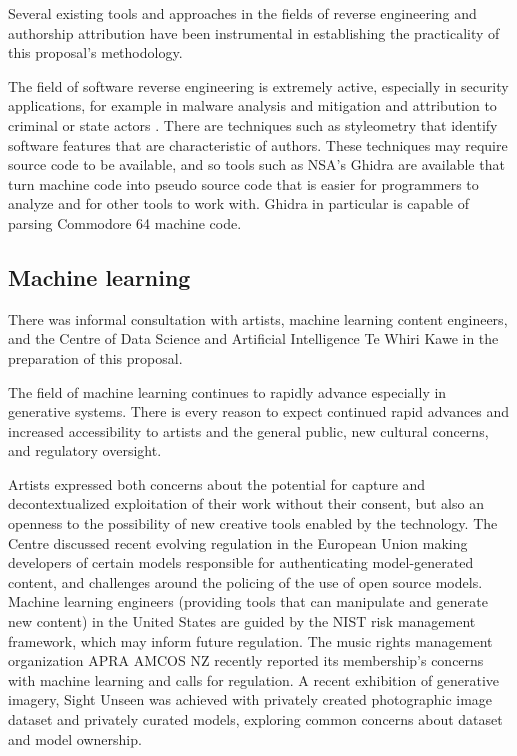 \documentclass[10pt]{article}
\begin{document}
\begin{multicols*}{2}
Several existing tools and approaches in the fields of reverse engineering and authorship attribution have been instrumental in establishing the practicality of this proposal's methodology.

The field of software reverse engineering is extremely active, especially in security applications, for example in malware analysis and mitigation and attribution to criminal or state actors \cite{mohammed2022malgridvisualizationbinaryfeatures}. There are techniques such as styleometry\cite{10.1145/3292577} that identify software features that are characteristic of authors. These techniques may require source code to be available, and so tools such as NSA's Ghidra\cite{ghidra} are available that turn machine code into pseudo source code that is easier for programmers to analyze and for other tools to work with. Ghidra in particular is capable of parsing Commodore 64 machine code.

\subsection{Machine learning}

There was informal consultation with artists, machine learning content engineers, and the Centre of Data Science and Artificial Intelligence Te Whiri Kawe in the preparation of this proposal.

The field of machine learning continues to rapidly advance especially in generative systems. There is every reason to expect continued rapid advances and increased accessibility to artists and the general public, new cultural concerns, and regulatory oversight.

Artists expressed both concerns about the potential for capture and decontextualized exploitation of their work without their consent\cite{datacollect}, but also an openness to the possibility of new creative tools enabled by the technology\cite{creativityai}. The Centre discussed recent evolving regulation in the European Union making developers of certain models responsible for authenticating model-generated content\cite{euairegs}, and challenges around the policing of the use of open source models. Machine learning engineers (providing tools that can manipulate and generate new content) in the United States are guided by the NIST risk management framework\cite{nistai}, which may inform future regulation. The music rights management organization APRA AMCOS NZ recently reported its membership's concerns with machine learning and calls for regulation\cite{aprastory}. A recent exhibition of generative imagery, Sight Unseen\cite{sightunseen} was achieved with privately created photographic image dataset and privately curated models, exploring common concerns about dataset and model ownership. 


\end{multicols*}
\end{document}
